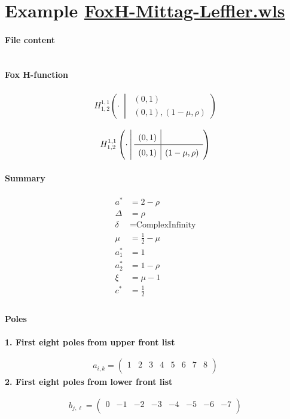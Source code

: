 \documentclass[11pt]{article}
\newcommand{\FoxH}[5]{H_{#2}^{#1}\left(#3\:\middle\vert\: \begin{array}{l}#4\\[0.4em] #5\end{array}\right)}
\begin{document}
\section{Example \url{FoxH-Mittag-Leffler.wls}}

\paragraph{File content}

\inputminted{text}{FoxH-Mittag-Leffler.wls}

\paragraph{Fox H-function}

\begin{align*}
  \FoxH
    {1,1}
    {1,2}
    {\cdot}
    {\left(0, 1\right)}
    {\left(0, 1\right), \left(1-\mu, \rho\right)}
\end{align*}

\begin{align*}
  \FoxHext
    {1,1}
    {1,2}
    {\cdot}
    {\left(0, 1\right)}
    {}
    {\left(0, 1\right)}
    {\left(1-\mu, \rho\right)}
\end{align*}

\paragraph{Summary}

\begin{align*}
  a^*    & = 2-\rho \\
  \Delta & = \rho \\
  \delta & = \text{ComplexInfinity} \\
  \mu    & = \frac{1}{2}-\mu \\
  a_1^*  & = 1 \\
  a_2^*  & = 1-\rho \\
  \xi    & = \mu -1 \\
  c^*    & = \frac{1}{2} \\
\end{align*}

\paragraph{Poles}

\noindent\textbf{1. First eight poles from upper front list}

\begin{align*}
  a_{i,k} = 
  \left(
\begin{array}{cccccccc}
 1 & 2 & 3 & 4 & 5 & 6 & 7 & 8 \\
\end{array}
\right)
\end{align*}
\noindent\textbf{2. First eight poles from lower front list}

\begin{align*}
  b_{j,\ell} = 
  \left(
\begin{array}{cccccccc}
 0 & -1 & -2 & -3 & -4 & -5 & -6 & -7 \\
\end{array}
\right)
\end{align*}

\printbibliography[title={References}]
\end{document}
